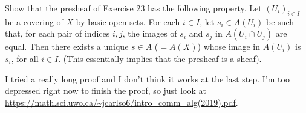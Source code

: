 \documentclass[a4paper]{exam}
\begin{document}
\begin{questions}
\question Show that the presheaf of Exercise 23 has the following property. Let $(U_i)_{i\in I} $ be a covering of $X $ by basic open sets. For each $i\in I $, let $s_i \in A(U_i) $ be such that, for each pair of indices $i,j $, the images of $s_i $ and $s_j $ in $A(U_i \cap U_j) $ are equal. Then there exists a unique $s\in A $ ($= A(X) $) whose image in $A(U_i) $ is $s_i $, for all $i\in I $. (This essentially implies that the presheaf is a sheaf).
\begin{solution}
	I tried a really long proof and I don't think it works at the last step.
	I'm too depressed right now to finish the proof, so just look at \url{https://math.sci.uwo.ca/~jcarlso6/intro_comm_alg(2019).pdf}.

\end{solution}
\end{questions}
\end{document}

